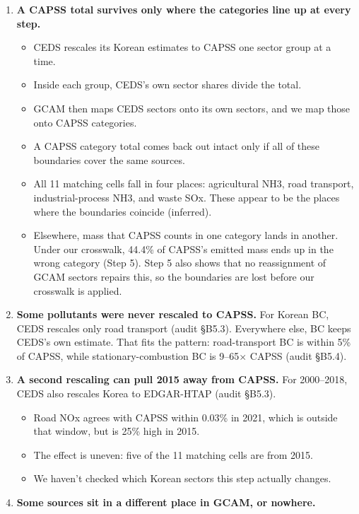 \begin{enumerate}
\def\labelenumi{\arabic{enumi}.}
\item
  \textbf{A CAPSS total survives only where the categories line up at every
  step.}

  \begin{itemize}
  \tightlist
  \item
    CEDS rescales its Korean estimates to CAPSS one sector group at a time.
  \item
    Inside each group, CEDS's own sector shares divide the total.
  \item
    GCAM then maps CEDS sectors onto its own sectors, and we map those onto
    CAPSS categories.
  \item
    A CAPSS category total comes back out intact only if all of these
    boundaries cover the same sources.
  \item
    All 11 matching cells fall in four places: agricultural NH3, road
    transport, industrial-process NH3, and waste SOx. These appear to be the
    places where the boundaries coincide (inferred).
  \item
    Elsewhere, mass that CAPSS counts in one category lands in another.
    Under our crosswalk, 44.4\% of CAPSS's emitted mass ends up in the wrong
    category (Step 5). Step 5 also shows that no reassignment of GCAM sectors
    repairs this, so the boundaries are lost before our crosswalk is applied.
  \end{itemize}
\item
  \textbf{Some pollutants were never rescaled to CAPSS.} For Korean BC, CEDS
  rescales only road transport (audit §B5.3). Everywhere else, BC keeps
  CEDS's own estimate. That fits the pattern: road-transport BC is within 5\%
  of CAPSS, while stationary-combustion BC is 9--65$\times$ CAPSS (audit
  §B5.4).
\item
  \textbf{A second rescaling can pull 2015 away from CAPSS.} For 2000--2018,
  CEDS also rescales Korea to EDGAR-HTAP (audit §B5.3).

  \begin{itemize}
  \tightlist
  \item
    Road NOx agrees with CAPSS within 0.03\% in 2021, which is outside that
    window, but is 25\% high in 2015.
  \item
    The effect is uneven: five of the 11 matching cells are from 2015.
  \item
    We haven't checked which Korean sectors this step actually changes.
  \end{itemize}
\item
  \textbf{Some sources sit in a different place in GCAM, or nowhere.}


\end{enumerate}
